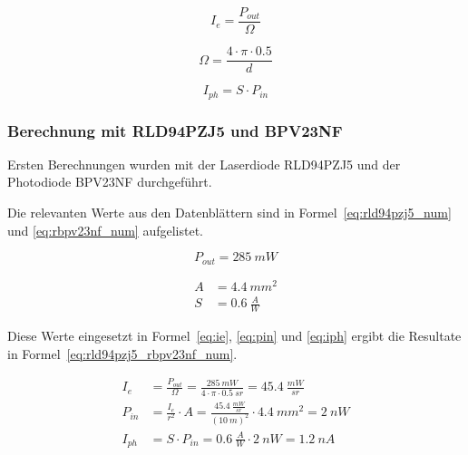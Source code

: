 \begin{equation}\label{eq:ie}
    I_e = \frac{P_{out}}{\Omega}
\end{equation}

\begin{equation}\label{eq:omega}
    \Omega = \frac{4\cdot \pi \cdot 0.5}{d}
\end{equation}

\begin{equation}\label{eq:iph}
    I_{ph} = S \cdot P_{in}
\end{equation}

\subsubsection{Berechnung mit RLD94PZJ5 und BPV23NF}

Ersten Berechnungen wurden mit der Laserdiode RLD94PZJ5 \cite{rohm2020rld94pzj5_datasheet} und der Photodiode BPV23NF
\cite{vishay2024bpv23nf_datasheet} durchgeführt.

Die relevanten Werte aus den Datenblättern sind in Formel~\ref{eq:rld94pzj5_num} und \ref{eq:rbpv23nf_num} aufgelistet.

\begin{equation}\label{eq:rld94pzj5_num}
    P_{out} = 285~mW
\end{equation}

\begin{equation}\label{eq:rbpv23nf_num}
    \begin{split}
        A &= 4.4~mm^2\\
        S &= 0.6~\frac{A}{W}
    \end{split}
\end{equation}

Diese Werte eingesetzt in Formel~\ref{eq:ie}, \ref{eq:pin} und \ref{eq:iph} ergibt die Resultate in
Formel~\ref{eq:rld94pzj5_rbpv23nf_num}.

\begin{equation}\label{eq:rld94pzj5_rbpv23nf_num}
    \begin{split}
        I_e    &= \frac{P_{out}}{\Omega} = \frac{285~mW}{4\cdot \pi \cdot 0.5~sr} = 45.4~\frac{mW}{sr}\\
        P_{in} &= \frac{I_e}{r^2} \cdot A = \frac{45.4~\frac{mW}{sr}}{(10~m)^2} \cdot 4.4~mm^2 = 2~nW\\
        I_{ph} &= S \cdot P_{in} = 0.6~\frac{A}{W} \cdot 2~nW = 1.2~nA
    \end{split}
\end{equation}


